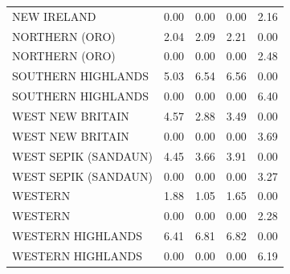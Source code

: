 \begin{tabular}{lcccc}
NEW IRELAND & 0.00 & 0.00 & 0.00 & 2.16 \\
NORTHERN (ORO) & 2.04 & 2.09 & 2.21 & 0.00 \\
NORTHERN (ORO) & 0.00 & 0.00 & 0.00 & 2.48 \\
SOUTHERN HIGHLANDS & 5.03 & 6.54 & 6.56 & 0.00 \\
SOUTHERN HIGHLANDS & 0.00 & 0.00 & 0.00 & 6.40 \\
WEST NEW BRITAIN & 4.57 & 2.88 & 3.49 & 0.00 \\
WEST NEW BRITAIN & 0.00 & 0.00 & 0.00 & 3.69 \\
WEST SEPIK (SANDAUN) & 4.45 & 3.66 & 3.91 & 0.00 \\
WEST SEPIK (SANDAUN) & 0.00 & 0.00 & 0.00 & 3.27 \\
WESTERN & 1.88 & 1.05 & 1.65 & 0.00 \\
WESTERN & 0.00 & 0.00 & 0.00 & 2.28 \\
WESTERN HIGHLANDS & 6.41 & 6.81 & 6.82 & 0.00 \\
WESTERN HIGHLANDS & 0.00 & 0.00 & 0.00 & 6.19 \\
\bottomrule \end{tabular}
